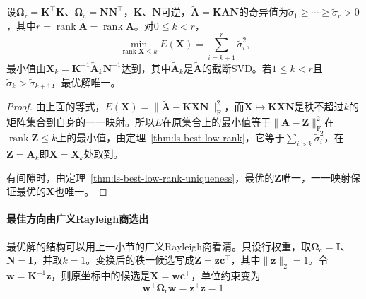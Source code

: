 \begin{theorem}[可分离权重下的最佳低秩逼近]
\label{thm:matrix-approximation-weighted-low-rank}
设$\bm\Omega_{\mathrm r}=\bm K^\top\bm K$、$\bm\Omega_{\mathrm c}=\bm N\bm N^\top$，$\bm K$、$\bm N$可逆，$\widetilde{\bm A}=\bm K\bm A\bm N$的奇异值为$\tilde\sigma_1\geq\cdots\geq\tilde\sigma_r>0$，其中$r=\operatorname{rank}\widetilde{\bm A}=\operatorname{rank}\bm A$。对$0\leq k<r$，
\begin{equation}
 \min_{\operatorname{rank}\bm X\leq k}E(\bm X)=\sum_{i=k+1}^r\tilde\sigma_i^2 ,
 \label{eq:matrix-approximation-weighted-low-rank-min}
\end{equation}
最小值由$\bm X_k=\bm K^{-1}\widetilde{\bm A}_k\bm N^{-1}$达到，其中$\widetilde{\bm A}_k$是$\widetilde{\bm A}$的截断SVD。若$1\leq k<r$且$\tilde\sigma_k>\tilde\sigma_{k+1}$，最优解唯一。
\end{theorem}
\begin{proof}
由上面的等式，$E(\bm X)=\lVert\widetilde{\bm A}-\bm K\bm X\bm N\rVert_{\mathrm F}^2$，而$\bm X\mapsto\bm K\bm X\bm N$是秩不超过$k$的矩阵集合到自身的一一映射。所以$E$在原集合上的最小值等于$\lVert\widetilde{\bm A}-\bm Z\rVert_{\mathrm F}^2$在$\operatorname{rank}\bm Z\leq k$上的最小值，由定理~\ref{thm:ls-best-low-rank}，它等于$\sum_{i>k}\tilde\sigma_i^2$，在$\bm Z=\widetilde{\bm A}_k$即$\bm X=\bm X_k$处取到。

有间隙时，由定理~\ref{thm:ls-best-low-rank-uniqueness}，最优的$\bm Z$唯一，一一映射保证最优的$\bm X$也唯一。
\end{proof}

\paragraph{最佳方向由广义Rayleigh商选出}
最优解的结构可以用上一小节的广义Rayleigh商看清。只设行权重，取$\bm\Omega_{\mathrm c}=\bm I$、$\bm N=\bm I$，并取$k=1$。变换后的秩一候选写成$\bm Z=\bm z\bm c^\top$，其中$\lVert\bm z\rVert_2=1$。令$\bm w=\bm K^{-1}\bm z$，则原坐标中的候选是$\bm X=\bm w\bm c^\top$，单位约束变为
\[
 \bm w^\top\bm\Omega_{\mathrm r}\bm w=\bm z^\top\bm z=1 .
\]

